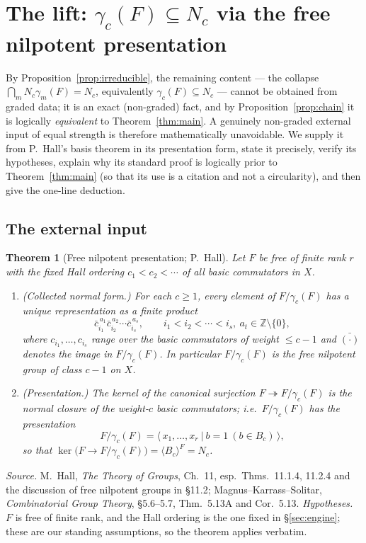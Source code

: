 \documentclass{amsart}
\newtheorem{theorem}{Theorem}
\theoremstyle{definition}
\theoremstyle{remark}
\begin{document}
\section{The lift: $\gamma_c(F)\subseteq N_c$ via the free nilpotent presentation}
\label{sec:lift}

By Proposition~\ref{prop:irreducible}, the remaining content --- the collapse
$\bigcap_m N_c\gamma_m(F)=N_c$, equivalently $\gamma_c(F)\subseteq N_c$ --- cannot be
obtained from graded data; it is an exact (non-graded) fact, and by
Proposition~\ref{prop:chain} it is logically \emph{equivalent} to Theorem~\ref{thm:main}.
A genuinely non-graded external input of equal strength is therefore mathematically
unavoidable. We supply it from P.~Hall's basis theorem in its presentation form, state it
precisely, verify its hypotheses, explain why its standard proof is logically prior to
Theorem~\ref{thm:main} (so that its use is a citation and not a circularity), and then give
the one-line deduction.

\subsection*{The external input}

\begin{theorem}[Free nilpotent presentation; P.~Hall]\label{thm:collection}
Let $F$ be free of finite rank $r$ with the fixed Hall ordering $c_1<c_2<\cdots$ of all
basic commutators in $X$.
\begin{enumerate}
\item[\textup{(NF)}] \textup{(Collected normal form.)} For each $c\ge1$, every element of
$F/\gamma_c(F)$ has a unique representation as a finite product
\[
\bar c_{i_1}^{\,a_1}\bar c_{i_2}^{\,a_2}\cdots\bar c_{i_s}^{\,a_s},\qquad
i_1<i_2<\cdots<i_s,\ a_t\in\mathbb Z\setminus\{0\},
\]
where $c_{i_1},\dots,c_{i_s}$ range over the basic commutators of weight $\le c-1$ and
$\bar{(\cdot)}$ denotes the image in $F/\gamma_c(F)$. In particular $F/\gamma_c(F)$ is the
free nilpotent group of class $c-1$ on $X$.
\item[\textup{(PR)}] \textup{(Presentation.)} The kernel of the canonical surjection
$F\twoheadrightarrow F/\gamma_c(F)$ is the normal closure of the weight-$c$ basic
commutators; i.e.\ $F/\gamma_c(F)$ has the presentation
\[
F/\gamma_c(F)=\big\langle\,x_1,\dots,x_r\ \big|\ b=1\ (b\in B_c)\,\big\rangle ,
\]
so that $\ker\big(F\to F/\gamma_c(F)\big)=\langle B_c\rangle^F=N_c$.
\end{enumerate}
\end{theorem}
\noindent\emph{Source.} M.~Hall, \emph{The Theory of Groups}, Ch.~11, esp.\ Thms.~11.1.4,
11.2.4 and the discussion of free nilpotent groups in \S11.2;
Magnus--Karrass--Solitar, \emph{Combinatorial Group Theory}, \S5.6--5.7, Thm.~5.13A and
Cor.~5.13. \emph{Hypotheses.} $F$ is free of finite rank, and the Hall ordering is the one
fixed in \S\ref{sec:engine}; these are our standing assumptions, so the theorem applies
verbatim.
\end{document}

